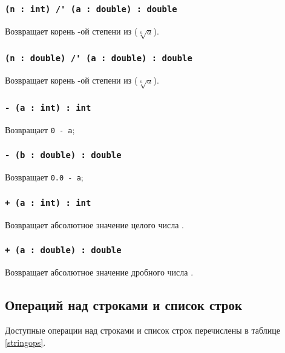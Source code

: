 \subsubsection{\lstinline|(n : int) /' (a : double) : double|}

Возвращает корень -ой степени из  ($\sqrt[n]{a}$).

\subsubsection{\lstinline|(n : double) /' (a : double) : double|}

Возвращает корень -ой степени из  ($\sqrt[n]{a}$).


\subsubsection{\lstinline|- (a : int) : int|}

Возвращает \lstinline|0 - a|;

\subsubsection{\lstinline|- (b : double) : double|}

Возвращает \lstinline|0.0 - a|;

\subsubsection{\lstinline|+ (a : int) : int|}

Возвращает абсолютное значение целого числа .

\subsubsection{\lstinline|+ (a : double) : double|}

Возвращает абсолютное значение дробного числа .

\subsection{Операций над строками и список строк}

Доступные операции над строками и список строк перечислены в таблице \ref{stringops}.

